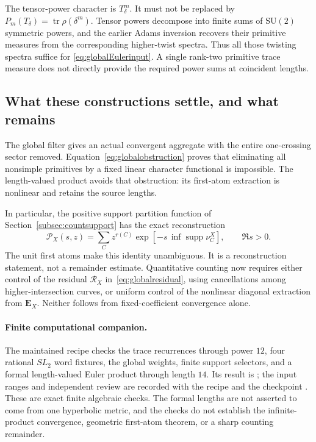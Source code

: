 The tensor-power character is $T_\delta^m$. It must not be
replaced by $P_m(T_\delta)=\operatorname{tr}\rho(\delta^m)$.
Tensor powers decompose into finite sums of $\mathrm{SU}(2)$
symmetric powers, and the earlier Adams inversion recovers their
primitive measures from the corresponding higher-twist spectra.
Thus all those twisting spectra suffice for
\eqref{eq:globalEulerinput}. A single rank-two primitive trace
measure does not directly provide the required power sums at
coincident lengths.

\subsection{What these constructions settle, and what remains}

The global filter gives an actual convergent aggregate with the
entire one-crossing sector removed. Equation~\eqref{eq:globalobstruction}
proves that eliminating all nonsimple primitives by a fixed linear
character functional is impossible. The length-valued product
avoids that obstruction: its first-atom extraction is nonlinear
and retains the source lengths.

In particular, the positive support partition function of
Section~\ref{subsec:countsupport} has the exact reconstruction
\[
 \mathcal P_X(s,z)
 =\sum_C z^{r(C)}
   \exp\!\left[-s\,\inf\operatorname{supp}\nu_C^X\right],
 \qquad \Re s>0.
\]
The unit first atoms make this identity unambiguous. It is a
reconstruction statement, not a remainder estimate. Quantitative
counting now requires either control of the residual
$\mathcal R_X$ in~\eqref{eq:globalresidual}, using cancellations
among higher-intersection curves, or uniform control of the
nonlinear diagonal extraction from $\mathbf E_X$. Neither follows
from fixed-coefficient convergence alone.

\paragraph{Finite computational companion.}
The maintained recipe  checks
the trace recurrences through power $12$, four rational $SL_2$ word
fixtures, the global weights, finite support selectors, and a formal
length-valued Euler product through length $14$. Its result is
; the input ranges and
independent review are recorded with the recipe and the checkpoint
.
These are exact finite algebraic checks. The formal lengths are not
asserted to come from one hyperbolic metric, and the checks do not
establish the infinite-product convergence, geometric first-atom
theorem, or a sharp counting remainder.

\clearpage

